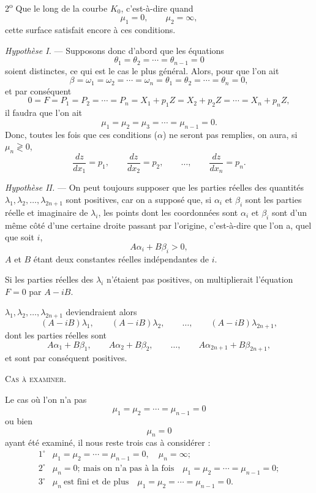 \documentclass[11pt]{article}
\begin{document}
2\textsuperscript{o} Que le long de la courbe $K_0$, c’est-à-dire quand
\[
\mu_1=0,
\qquad
\mu_2=\infty,
\]
cette surface satisfait encore à ces conditions.

\emph{Hypothèse I.} --- Supposons donc d’abord que les équations
\[
\theta_1=\theta_2=\cdots=\theta_{n-1}=0
\]
soient distinctes, ce qui est le cas le plus général. Alors, pour que l’on ait
\[
\beta=\omega_1=\omega_2=\cdots=\omega_n=\theta_1=\theta_2=\cdots=\theta_n=0,
\]
et par conséquent
\[
0=F=P_1=P_2=\cdots=P_n=X_1+p_1Z=X_2+p_2Z=\cdots=X_n+p_nZ,
\]
il faudra que l’on ait
\begin{equation*}\tag{$\alpha$}
\mu_1=\mu_2=\mu_3=\cdots=\mu_{n-1}=0.
\end{equation*}
Donc, toutes les fois que ces conditions ($\alpha$) ne seront pas remplies, on aura, si $\mu_n\gtrless0$,
\[
\frac{dz}{dx_1}=p_1,
\qquad
\frac{dz}{dx_2}=p_2,
\qquad
\ldots,
\qquad
\frac{dz}{dx_n}=p_n.
\]

\emph{Hypothèse II.} --- On peut toujours supposer que les parties réelles des quantités $\lambda_1,\lambda_2,\ldots,\lambda_{2n+1}$ sont positives, car on a supposé que, si $\alpha_i$ et $\beta_i$ sont les parties réelle et imaginaire de $\lambda_i$, les points dont les coordonnées sont $\alpha_i$ et $\beta_i$ sont d’un même côté d’une certaine droite passant par l’origine, c’est-à-dire que l’on a, quel que soit $i$,
\[
A\alpha_i+B\beta_i>0,
\]
$A$ et $B$ étant deux constantes réelles indépendantes de $i$.

Si les parties réelles des $\lambda_i$ n’étaient pas positives, on multiplierait l’équation $F=0$ par $A-iB$.

$\lambda_1,\lambda_2,\ldots,\lambda_{2n+1}$ deviendraient alors
\[
(A-iB)\lambda_1,
\qquad
(A-iB)\lambda_2,
\qquad
\ldots,
\qquad
(A-iB)\lambda_{2n+1},
\]
dont les parties réelles sont
\[
A\alpha_1+B\beta_1,
\qquad
A\alpha_2+B\beta_2,
\qquad
\ldots,
\qquad
A\alpha_{2n+1}+B\beta_{2n+1},
\]
et sont par conséquent positives.

\begin{center}
{\scshape Cas à examiner.}
\end{center}

Le cas où l’on n’a pas
\[
\mu_1=\mu_2=\cdots=\mu_{n-1}=0
\]
ou bien
\[
\mu_n=0
\]
ayant été examiné, il nous reste trois cas à considérer :
\[
\begin{array}{rl}
1^\circ& \mu_1=\mu_2=\cdots=\mu_{n-1}=0,\quad \mu_n=\infty;\\[0.3em]
2^\circ& \mu_n=0;\ \text{mais on n’a pas à la fois}\quad \mu_1=\mu_2=\cdots=\mu_{n-1}=0;\\[0.3em]
3^\circ& \mu_n\ \text{est fini et de plus}\quad \mu_1=\mu_2=\cdots=\mu_{n-1}=0.
\end{array}
\]
\end{document}
